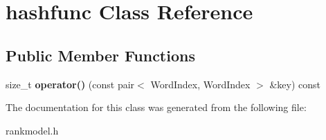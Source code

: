 \hypertarget{classhashfunc}{\section{hashfunc \-Class \-Reference}
\label{classhashfunc}
}
\subsection*{\-Public \-Member \-Functions}
\begin{DoxyCompactItemize}
\item 
\hypertarget{classhashfunc_a2ac8836efcb33183813890feb5893596}{size\-\_\-t {\bfseries operator()} (const pair$<$ \-Word\-Index, \-Word\-Index $>$ \&key) const }\label{classhashfunc_a2ac8836efcb33183813890feb5893596}

\end{DoxyCompactItemize}


\-The documentation for this class was generated from the following file\-:\begin{DoxyCompactItemize}
\item 
rankmodel.\-h\end{DoxyCompactItemize}
